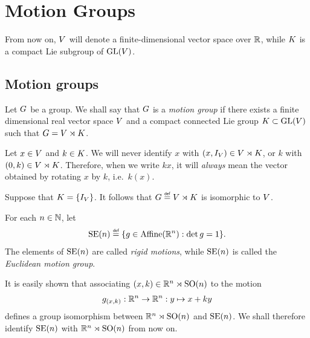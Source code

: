 \chapter{Motion Groups}

From now on,
$V$ will denote a finite-dimensional vector space over $\mathbb{R}$,
while $K$ is a compact Lie subgroup of $\mathrm{GL}(V)$.

\section{Motion groups}

\begin{definition}
\label{definition:motion_group}
    Let $G$ be a group.
    We shall say that $G$ is a \emph{motion group}
    if there exists a finite dimensional real vector space $V$
    and a compact connected Lie group $K \subset \mathrm{GL}(V)$
    such that $G = V \rtimes K$.
\end{definition}

\begin{remark}
\label{remark:notation_kx}
    Let $x \in V$ and $k \in K$.
    We will never identify $x$ with $(x, {I_{V}}) \in V \rtimes K$,
    or $k$ with $(0, k) \in V \rtimes K$.
    Therefore, when we write $k x$, it will \emph{always} mean the vector obtained by rotating $x$ by $k$, i.e.\ $k(x)$.
\end{remark}

\begin{example}
\label{example:trivial_case_of_motion_groups}
    Suppose that $K = \{{I_{V}}\}$.
    It follows that $\Group \defeq \VectorSpace \rtimes \CompactGroup$ is isomorphic to $V$.
\end{example}

\begin{example}
\label{example:Euclidean_motion_groups}
    For each $n \in \mathbb{N}$, let
    \begin{align*}
        \MotionGroup{n} \defeq \{g \in \AffineTransformations{\R^n} : \det g = 1\}.
    \end{align*}
    The elements of ${\mathrm{SE} (n)}$ are called \emph{rigid motions},
    while ${\mathrm{SE} (n)}$ is called the \emph{Euclidean motion group}.

    It is easily shown that associating $(x, k) \in \mathbb{R}^n \rtimes {\mathrm{SO} (n)}$ to the motion
    \begin{align*}
        g_{(x, k)} : \mathbb{R}^n \to \mathbb{R}^n : y \mapsto x + ky
    \end{align*}
    defines a group isomorphism between $\mathbb{R}^n \rtimes {\mathrm{SO} (n)}$ and ${\mathrm{SE} (n)}$.
    We shall therefore identify ${\mathrm{SE} (n)}$ with $\mathbb{R}^n \rtimes {\mathrm{SO} (n)}$ from now on.
\end{example}

